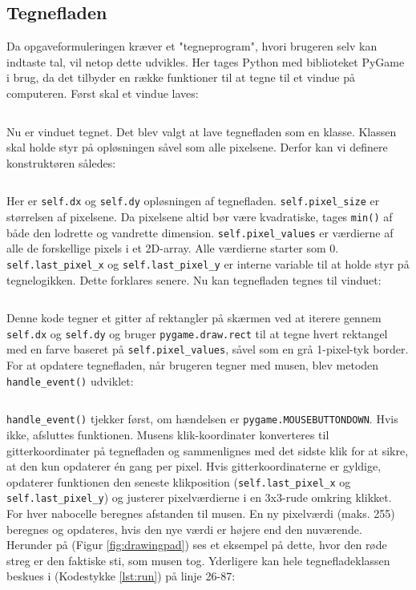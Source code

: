 \documentclass{article}
\newcommand{\figureref}[1]{(Figur \ref{#1})}
\newcommand{\listingref}[1]{(Kodestykke \ref{#1})}
\begin{document}
\subsection{Tegnefladen}
Da opgaveformuleringen kræver et "tegneprogram", hvori brugeren selv kan indtaste tal, vil netop dette udvikles. Her tages Python med biblioteket PyGame i brug, da det tilbyder en række funktioner til at tegne til et vindue på computeren. Først skal et vindue laves:
\inputminted[firstline=8, lastline=11]{python}{run.py}\noindent
Nu er vinduet tegnet. Det blev valgt at lave tegnefladen som en klasse. Klassen skal holde styr på opløsningen såvel som alle pixelsene. Derfor kan vi definere konstruktøren således:
\inputminted[firstline=26, lastline=34]{python}{run.py}\noindent
Her er \texttt{self.dx} og \texttt{self.dy} opløsningen af tegnefladen. \texttt{self.pixel\_size} er størrelsen af pixelsene. Da pixelsene altid bør være kvadratiske, tages \texttt{min()} af både den lodrette og vandrette dimension. \texttt{self.pixel\_values} er værdierne af alle de forskellige pixels i et 2D-array. Alle værdierne starter som 0. \texttt{self.last\_pixel\_x} og \texttt{self.last\_pixel\_y} er interne variable til at holde styr på tegnelogikken. Dette forklares senere. Nu kan tegnefladen tegnes til vinduet:
\inputminted[firstline=62, lastline=74]{python}{run.py}\noindent
Denne kode tegner et gitter af rektangler på skærmen ved at iterere gennem \texttt{self.dx} og \texttt{self.dy} og bruger \texttt{pygame.draw.rect} til at tegne hvert rektangel med en farve baseret på \texttt{self.pixel\_values}, såvel som en grå 1-pixel-tyk border. For at opdatere tegnefladen, når brugeren tegner med musen, blev metoden \texttt{handle\_event()} udviklet:
\inputminted[firstline=36, lastline=60]{python}{run.py}\noindent
\texttt{handle\_event()} tjekker først, om hændelsen er \texttt{pygame.MOUSEBUTTONDOWN}. Hvis ikke, afsluttes funktionen. Musens klik-koordinater konverteres til gitterkoordinater på tegnefladen og sammenlignes med det sidste klik for at sikre, at den kun opdaterer én gang per pixel. Hvis gitterkoordinaterne er gyldige, opdaterer funktionen den seneste klikposition (\texttt{self.last\_pixel\_x} og \texttt{self.last\_pixel\_y}) og justerer pixelværdierne i en 3x3-rude omkring klikket. For hver nabocelle beregnes afstanden til musen. En ny pixelværdi (maks. 255) beregnes og opdateres, hvis den nye værdi er højere end den nuværende. Herunder på \figureref{fig:drawingpad} ses et eksempel på dette, hvor den røde streg er den faktiske sti, som musen tog. Yderligere kan hele tegnefladeklassen beskues i \listingref{lst:run} på linje 26-87:
\end{document}
